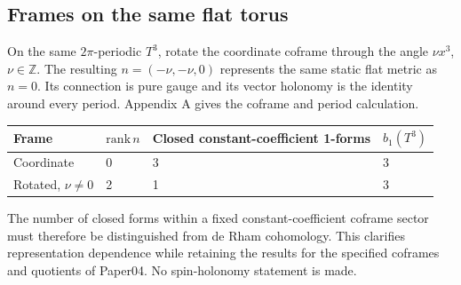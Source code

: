 \subsection{Frames on the same flat torus}

On the same $2\pi$-periodic $T^3$, rotate the coordinate coframe through the angle $\nu x^3$, $\nu\in\mathbb Z$. The resulting $n=(-\nu,-\nu,0)$ represents the same static flat metric as $n=0$. Its connection is pure gauge and its vector holonomy is the identity around every period. Appendix A gives the coframe and period calculation.

\begin{center}\small
\begin{tabularx}{\textwidth}{@{}lllX@{}}
\toprule
Frame & $\mathrm{rank}\,n$ & Closed constant-coefficient 1-forms & $b_1(T^3)$\\\midrule
Coordinate & 0 & 3 & 3\\
Rotated, $\nu\ne0$ & 2 & 1 & 3\\
\bottomrule\end{tabularx}\end{center}

The number of closed forms within a fixed constant-coefficient coframe sector must therefore be distinguished from de Rham cohomology. This clarifies representation dependence while retaining the results for the specified coframes and quotients of Paper04. No spin-holonomy statement is made.
